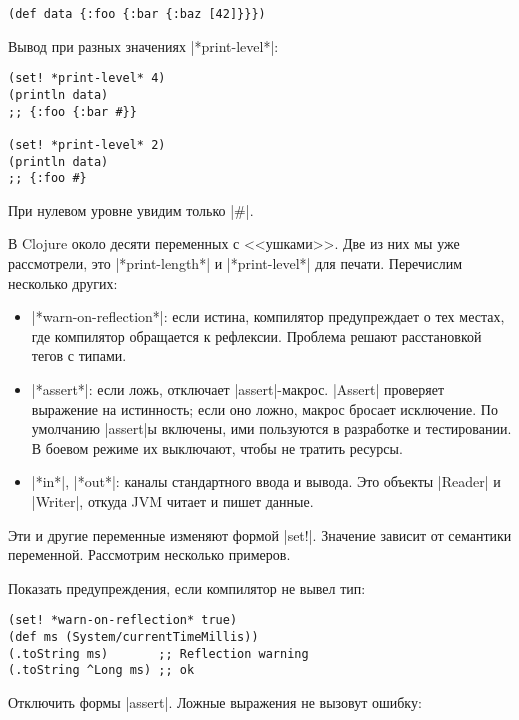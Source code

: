\begin{verbatim}
(def data {:foo {:bar {:baz [42]}}})
\end{verbatim}

\noindent
Вывод при разных значениях \spverb|*print-level*|:

\begin{verbatim}
(set! *print-level* 4)
(println data)
;; {:foo {:bar #}}

(set! *print-level* 2)
(println data)
;; {:foo #}
\end{verbatim}

\noindent
При нулевом уровне увидим только \spverb|#|.

В Clojure около десяти переменных с <<ушками>>. Две из них мы уже рассмотрели,
это \spverb|*print-length*| и \spverb|*print-level*| для печати. Перечислим
несколько других:

\begin{itemize}

\item
  \spverb|*warn-on-reflection*|: если истина, компилятор предупреждает о тех
  местах, где компилятор обращается к рефлексии. Проблема решают расстановкой
  тегов с типами.

\item
  \spverb|*assert*|: если ложь, отключает
  \spverb|assert|-макрос. \spverb|Assert| проверяет выражение на истинность;
  если оно ложно, макрос бросает исключение. По умолчанию \spverb|assert|ы
  включены, ими пользуются в разработке и тестировании. В боевом режиме их
  выключают, чтобы не тратить ресурсы.

\item
  \spverb|*in*|, \spverb|*out*|: каналы стандартного ввода и вывода. Это объекты
  \spverb|Reader| и \spverb|Writer|, откуда JVM читает и пишет данные.

\end{itemize}

Эти и другие переменные изменяют формой \spverb|set!|. Значение зависит от
семантики переменной. Рассмотрим несколько примеров.

Показать предупреждения, если компилятор не вывел тип:


\begin{verbatim}
(set! *warn-on-reflection* true)
(def ms (System/currentTimeMillis))
(.toString ms)       ;; Reflection warning
(.toString ^Long ms) ;; ok
\end{verbatim}

Отключить формы \spverb|assert|. Ложные выражения не вызовут ошибку:

